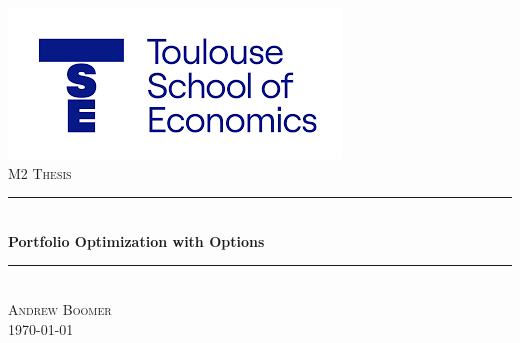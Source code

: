 

\usepackage[justification=centering, skip=0pt]{caption}
\usepackage{float}


\begin{titlepage}

\newcommand{\HRule}{\rule{\linewidth}{0.25mm}} %
\setlength{\topmargin}{-0.5in}
\setlength{\textfloatsep}{0pt}
\center %

\includegraphics[scale=0.75]{TSE.png}\\

\large \textsc{M2 Thesis} 
\vspace{1.5cm}
\textsc{\large } %


\HRule \\[0.75cm]
{ \huge \bfseries Portfolio Optimization with Options}\\[0.5cm] %
\HRule \\[1.75cm]
 

\large\textsc{Andrew Boomer} \\[1.5cm]


{\large \today}\\[0.5cm] %

\vfill %

\end{titlepage}

